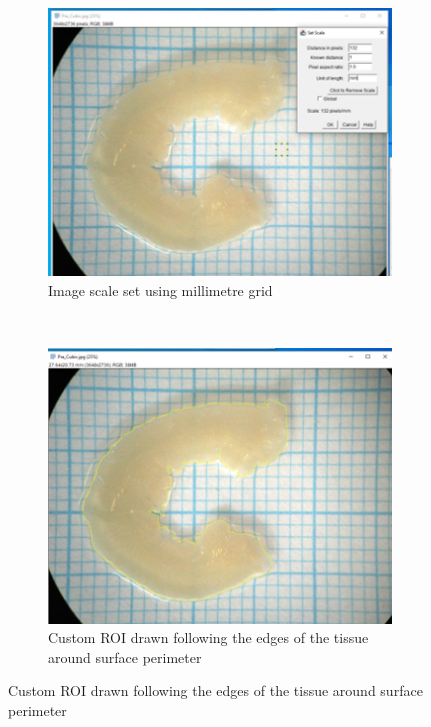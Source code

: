 \begin{figure}[H]
      
    \begin{subfigure}[t]{.475\textwidth}
    \centering
    \includegraphics[width=\linewidth]{Figures/MeasureProt1.png}
    \caption{Image scale set using millimetre grid}
    \end{subfigure}\hfill
    ~
    \begin{subfigure}[t]{.475\textwidth}
    \centering
    \includegraphics[width=\linewidth]{Figures/MeasureProt2.png}
    \caption{Custom ROI drawn following the edges of the tissue around surface perimeter}
    \end{subfigure}\hfill
    

\end{figure}
